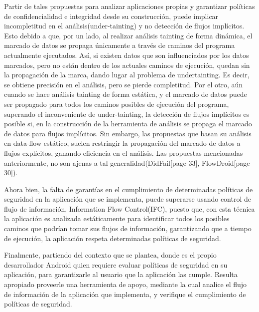 Partir de tales propuestas para analizar aplicaciones propias y garantizar
políticas de confidencialidad e integridad desde su construcción, puede implicar
incompletitud en el análisis(under-tainting) y no detección de flujos
implícitos. Esto debido a que,
por un lado, al realizar análisis tainting de forma dinámica, el marcado de
datos se propaga únicamente a través de caminos del programa actualmente
ejecutados. Así, si existen datos que son influenciados por los datos marcados,
pero no están dentro de los actuales caminos de ejecución, quedan sin la
propagación de la marca, dando lugar al problema de
undertainting\cite{dynamic-tainting}\cite{Bit-Level-Taint-Analysis}. Es
decir, se obtiene precisión en el análisis, pero se pierde completitud.\newline
Por el otro, aún cuando se hace análisis tainting de forma estática, y el
marcado de datos puede ser propagado para todos los caminos posibles de
ejecución  del programa, superando el inconveniente de under-tainting, la
detección de flujos implícitos es posible si, en la construcción de la
herramienta de análisis se propaga el marcado de datos para flujos
implícitos\cite{taint-analysis}. 
Sin embargo, las propuestas que basan su análisis en data-flow estático,
suelen restringir la propagación del marcado de datos a flujos explícitos,
ganando eficiencia en el análisis. Las propuestas mencionadas anteriormente, no
son ajenas a tal generalidad(DidFail\cite{DidFail}[page 33],
FlowDroid\cite{FlowDroid-Thesis}[page 30]).

Ahora bien, la falta de garantías en el cumplimiento de determinadas
políticas de seguridad en la aplicación que se implementa, puede superarse
usando control de flujo de información, Information Flow Control(IFC), puesto
que, con esta técnica la aplicación  es analizada estáticamente  para
identificar todos los posibles caminos que podrían tomar sus flujos de
información, garantizando que a tiempo de ejecución, la aplicación respeta
determinadas políticas de seguridad.

Finalmente, partiendo del contexto que se plantea, donde es el propio
desarrollador Android quien requiere evaluar políticas de seguridad en su
aplicación, para  garantizarle al usuario que la aplicación las cumple. Resulta
apropiado proveerle una herramienta de apoyo, mediante la cual analice el flujo
de información de la aplicación que implementa, y verifique el cumplimiento
de políticas de seguridad.\newline

  
















